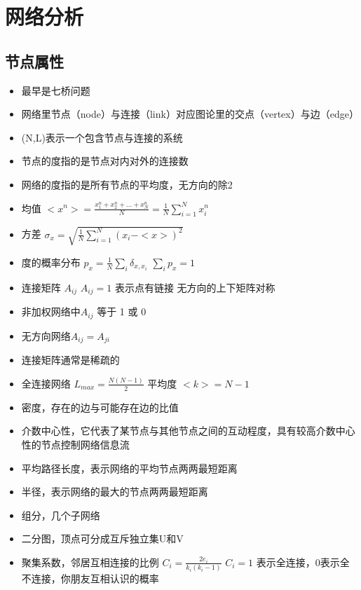 \documentclass[
]{book}
\providecommand{\tightlist}{%
  \setlength{\itemsep}{0pt}\setlength{\parskip}{0pt}}
\begin{document}
\hypertarget{neta}{%
\chapter{网络分析}\label{neta}}

\hypertarget{ux8282ux70b9ux5c5eux6027}{%
\section{节点属性}\label{ux8282ux70b9ux5c5eux6027}}

\begin{itemize}
\tightlist
\item
  最早是七桥问题
\item
  网络里节点（node）与连接（link）对应图论里的交点（vertex）与边（edge）
\item
  (N,L)表示一个包含节点与连接的系统
\item
  节点的度指的是节点对内对外的连接数
\item
  网络的度指的是所有节点的平均度，无方向的除2
\item
  均值 \(<x^n> = \frac{x_1^n+x_2^n+...+x_N^n}{N} = \frac{1}{N}\sum_{i=1}^N x_i^n\)
\item
  方差 \(\sigma_x = \sqrt{\frac{1}{N}\sum_{i=1}^N (x_i-<x>)^2}\)
\item
  度的概率分布 \(p_x = \frac{1}{N}\sum_i \delta_{x,x_i}\) \(\sum_ip_x = 1\)
\item
  连接矩阵 \(A_{ij}\) \(A_{ij} = 1\) 表示点有链接 无方向的上下矩阵对称
\item
  非加权网络中\(A_{ij}\) 等于 1 或 0
\item
  无方向网络\(A_{ij} = A_{ji}\)
\item
  连接矩阵通常是稀疏的
\item
  全连接网络 \(L_{max} = \frac{N(N-1)}{2}\) 平均度 \(<k> = N-1\)
\item
  密度，存在的边与可能存在边的比值
\item
  介数中心性，它代表了某节点与其他节点之间的互动程度，具有较高介数中心性的节点控制网络信息流
\item
  平均路径长度，表示网络的平均节点两两最短距离
\item
  半径，表示网络的最大的节点两两最短距离
\item
  组分，几个子网络
\item
  二分图，顶点可分成互斥独立集U和V
\item
  聚集系数，邻居互相连接的比例 \(C_i = \frac{2e_i}{k_i(k_i-1)}\) \(C_i =1\) 表示全连接，0表示全不连接，你朋友互相认识的概率
\end{itemize}
\end{document}
